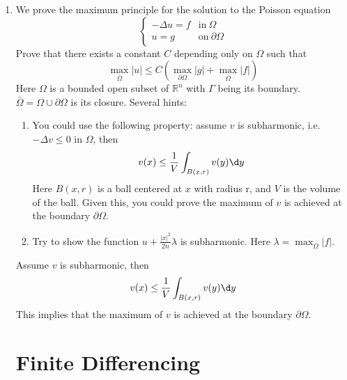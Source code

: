 \documentclass{article}
\newcommand\NoIndent[1]{%
  \begingroup
  \par
  \parshape0
  #1\par
  \endgroup
}
\begin{document}
\begin{enumerate}
	\item We prove the maximum principle for the solution to the Poisson equation
		\begin{equation*}
			\begin{cases}
				-\Delta u = f & \mathrm{in\ } \Omega \\
				u = g & \mathrm{on\ } \partial\Omega
			\end{cases}
		\end{equation*}
		Prove that there exists a constant $C$ depending only on $\Omega$ such that
		\begin{equation*}
			\max_{\bar{\Omega}}|u| \leq C\left(\max_{\partial\Omega}|g| + \max_{\bar{\Omega}}|f|\right)
		\end{equation*}
		Here $\Omega$ is a bounded open subset of $\mathbb{R}^n$ with $\Gamma$ being its boundary.
		$\bar{\Omega} = \Omega \cup \partial\Omega$ is its closure.
		Several hints:
		\begin{enumerate}
			\item You could use the following property:
				assume $v$ is subharmonic, i.e.\ $-\Delta v \leq 0$ in $\Omega$, then
				\begin{equation*}
					v(x) \leq \frac{1}{V}\int_{B(x,r)}v(y)\d y
				\end{equation*}
				Here $B(x,r)$ is a ball centered at $x$ with radius r, and $V$ is the volume of the ball.
				Given this, you could prove the maximum of $v$ is achieved at the boundary $\partial\Omega$.
			\item Try to show the function $u + \displaystyle\frac{|x|^2}{2n}\lambda$ is subharmonic.
			Here $\lambda = \displaystyle\max_{\bar{\Omega}}|f|$.
		\end{enumerate}

\NoIndent{
	Assume $v$ is subharmonic, then
	\begin{equation*}
		v(x) \leq \frac{1}{V}\int_{B(x,r)}v(y)\d y
	\end{equation*}
	This implies that the maximum of $v$ is achieved at the boundary $\partial\Omega$.
	
}

\NoIndent{\section{Finite Differencing}}


\end{enumerate}
\end{document}
